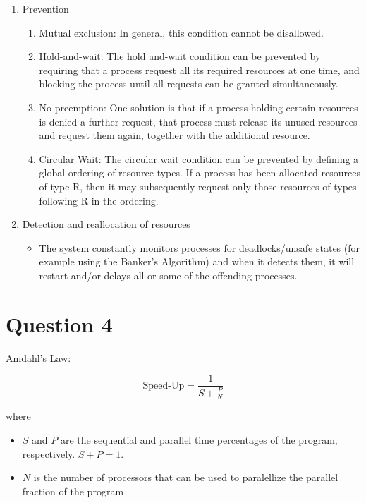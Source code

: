 \documentclass[11pt, letterpaper]{article}
\begin{document}
\begin{enumerate}
    \item Prevention
        \begin{enumerate}[label=\arabic*.]
            \item Mutual exclusion: In general, this condition cannot be disallowed.
            \item Hold-and-wait: The hold and-wait condition can be prevented by requiring that a process request all its required resources at one time, and blocking the process until all requests can be granted simultaneously. 
            \item No preemption: One solution is that if a process holding certain resources is denied a further request, that process must release its unused resources and request them again, together with the additional resource. 
            \item Circular Wait: The circular wait condition can be prevented by defining a global ordering of resource types. If a process has been allocated resources of type R, then it may subsequently request only those resources of types following R in the ordering. 
        \end{enumerate}
    \item Detection and reallocation of resources
        \begin{itemize}
            \item The system constantly monitors processes for deadlocks/unsafe states (for example using the Banker’s Algorithm) and when it detects them, it will restart and/or delays all or some of the offending processes.
        \end{itemize}
\end{enumerate}
\pagebreak

\section*{Question 4}

Amdahl's Law:

$$
\text{Speed-Up} = \frac{1}{S + \frac{P}{N}}
$$

where

\begin{itemize}
    \item $S$ and $P$ are the sequential and parallel time percentages of the program, respectively. $S + P = 1$.
    \item $N$ is the number of processors that can be used to paralellize the parallel fraction of the program
\end{itemize}
\end{document}
